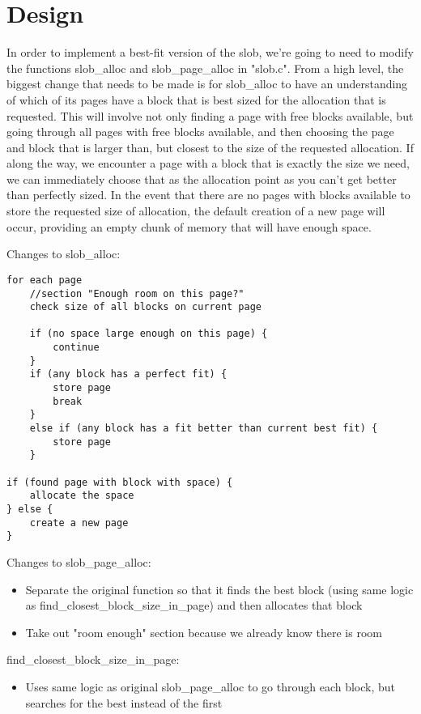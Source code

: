 \section{Design}
In order to implement a best-fit version of the slob, we're going to need to modify the functions slob\_alloc and slob\_page\_alloc in "slob.c".  From a high level, the biggest change that needs to be made is for slob\_alloc to have an understanding of which of its pages have a block that is best sized for the allocation that is requested. This will involve not only finding a page with free blocks available, but going through all pages with free blocks available, and then choosing the page and block that is larger than, but closest to the size of the requested allocation. If along the way, we encounter a page with a block that is exactly the size we need, we can immediately choose that as the allocation point as you can't get better than perfectly sized. In the event that there are no pages with blocks available to store the requested size of allocation, the default creation of a new page will occur, providing an empty chunk of memory that will have enough space.

Changes to slob\_alloc:
\begin{lstlisting}[lineskip=3pt,keywords={if,else,while,for}]
for each page
	//section "Enough room on this page?"
	check size of all blocks on current page
    
	if (no space large enough on this page) {
		continue
	}
	if (any block has a perfect fit) {
		store page
		break
	}
	else if (any block has a fit better than current best fit) {
		store page
	}

if (found page with block with space) {
	allocate the space
} else {
	create a new page
}

\end{lstlisting}

Changes to slob\_page\_alloc:
\begin{itemize}
	\item Separate the original function so that it finds the best block (using same logic as find\_closest\_block\_size\_in\_page) and then allocates that block
    \item Take out "room enough" section because we already know there is room
\end{itemize}
    
find\_closest\_block\_size\_in\_page:
\begin{itemize}
	\item Uses same logic as original slob\_page\_alloc to go through each block, but searches for the best instead of the first
\end{itemize}
